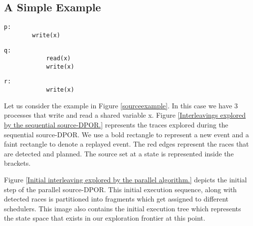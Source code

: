 \subsection{A Simple Example}


\begin{figure*}
    \begin{minipage}{0.3\textwidth}
      \begin{lstlisting}[frame=none, numbers=none]
        p:
        write(x)
      \end{lstlisting}
    \end{minipage}
    \begin{minipage}{0.3\textwidth}
        \begin{lstlisting}[frame=none, numbers=none]
            q:
            read(x)
            write(x)
        \end{lstlisting}
      \end{minipage}
      \begin{minipage}{0.3\textwidth}
        \begin{lstlisting}[frame=none, numbers=none]
            r:
            write(x)
        \end{lstlisting}
      \end{minipage}
      \caption{Simple readers-writers example}
      \label{sourceexample}
  \end{figure*}

Let us consider the example in Figure \ref{sourceexample}. In this case we have 3 processes that write and read a shared variable x.
Figure \ref{Interleavings explored by the sequential source-DPOR.} represents the traces explored during the sequential source-DPOR.
We use a bold rectangle to represent a new event and a faint rectangle to denote a replayed event. The red edges represent
the races that are detected and planned. The source set at a state is represented inside the brackets.



Figure \ref{Initial interleaving explored by the parallel algorithm.} depicts the initial step of the parallel source-DPOR. 
This initial execution sequence, along with detected races is partitioned into fragments which get assigned to different schedulers.
This image also contains the initial execution tree which represents the state space that exists in our exploration frontier
at this point.

